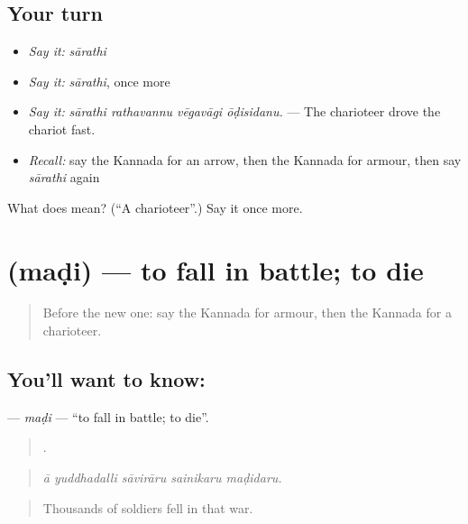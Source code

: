 \subsection*{Your turn}
\begin{itemize}
\raggedright
  \item \emph{Say it:} \emph{sārathi}
  \item \emph{Say it:} \emph{sārathi}, once more
  \item \emph{Say it:} \emph{sārathi rathavannu vēgavāgi ōḍisidanu.} — The charioteer drove the chariot fast.
  \item \emph{Recall:} say the Kannada for an arrow, then the Kannada for armour, then say \emph{sārathi} again
\end{itemize}

\begin{tcolorbox}[breakable,colback=teal!4,colframe=teal!35!black,title={Before you move on}]
What does  mean? (\textquotedblleft{}A charioteer\textquotedblright{}.) Say it once more.
\end{tcolorbox}
\section[\texorpdfstring{\kn{ಮಡಿ} (maḍi)}{ಮಡಿ (maḍi)}]{ (maḍi) — to fall in battle; to die}

\label{lesson:KA-C349-madi}



\begin{quote}
Before the new one: say the Kannada for armour, then the Kannada for a charioteer.
\end{quote}

\subsection*{You'll want to know: }
\textbf{} — \emph{maḍi} — \textquotedblleft{}to fall in battle; to die\textquotedblright{}.

\begin{quote}
    .
\end{quote}

\begin{quote}
\emph{ā yuddhadalli sāvirāru sainikaru maḍidaru.}
\end{quote}

\begin{quote}
Thousands of soldiers fell in that war.
\end{quote}

